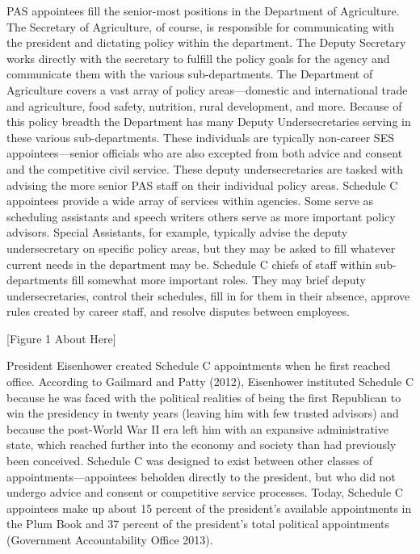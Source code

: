 \documentclass[12pt]{article}
\begin{document}
PAS appointees fill the senior-most positions in the Department of Agriculture. The Secretary of Agriculture, of course, is responsible for communicating with the president and dictating policy within the department. The Deputy Secretary works directly with the secretary to fulfill the policy goals for the agency and communicate them with the various sub-departments. The Department of Agriculture covers a vast array of policy areas---domestic and international trade and agriculture, food safety, nutrition, rural development, and more. Because of this policy breadth the Department has many Deputy Undersecretaries serving in these various sub-departments. These individuals are typically non-career SES appointees---senior officials who are also excepted from both advice and consent and the competitive civil service. These deputy undersecretaries are tasked with advising the more senior PAS staff on their individual policy areas. Schedule C appointees provide a wide array of services within agencies. Some serve as scheduling assistants and speech writers others serve as more important policy advisors. Special Assistants, for example, typically advise the deputy undersecretary on specific policy areas, but they may be asked to fill whatever current needs in the department may be. Schedule C chiefs of staff within sub-departments fill somewhat more important roles. They may brief deputy undersecretaries, control their schedules, fill in for them in their absence, approve rules created by career staff, and resolve disputes between employees. 
	
\begin{center}[Figure 1 About Here]	\end{center}

	President Eisenhower created Schedule C appointments when he first reached office. According to Gailmard and Patty (2012), Eisenhower instituted Schedule C because he was faced with the political realities of being the first Republican to win the presidency in twenty years (leaving him with few trusted advisors) and because the post-World War II era left him with an expansive administrative state, which reached further into the economy and society than had previously been conceived. Schedule C was designed to exist between other classes of appointments---appointees beholden directly to the president, but who did not undergo advice and consent or competitive service processes. Today, Schedule C appointees make up about 15 percent of the president's available appointments in the Plum Book and 37 percent of the president's total political appointments (Government Accountability Office 2013).
	
\end{document}
